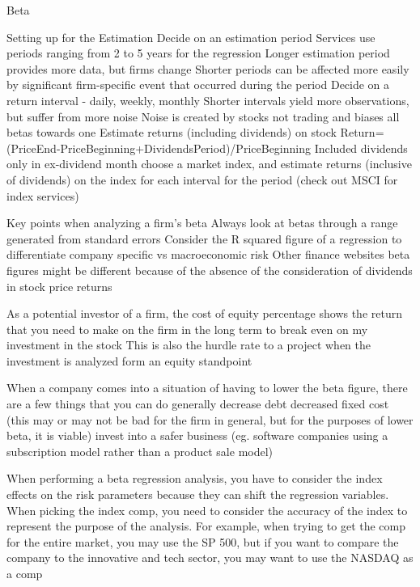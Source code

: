 \documentclass[10pt]{article}
\begin{document}
    \begin{core}{Beta}

      Setting up for the Estimation
      Decide on an estimation period
      Services use periods ranging from 2 to 5 years for the regression
      Longer estimation period provides more data, but firms change
      Shorter periods can be affected more easily by significant firm-specific event that occurred during the period
      Decide on a return interval - daily, weekly, monthly
      Shorter intervals yield more observations, but suffer from more noise
      Noise is created by stocks not trading and biases all betas towards one
      Estimate returns (including dividends) on stock
      Return=(PriceEnd-PriceBeginning+DividendsPeriod)/PriceBeginning
      Included dividends only in ex-dividend month
      choose a market index, and estimate returns (inclusive of dividends) on the index for each interval for the period (check out MSCI for index services)

      Key points when analyzing a firm’s beta
      Always look at betas through a range generated from standard errors
      Consider the R squared figure of a regression to differentiate company specific vs macroeconomic risk
      Other finance websites beta figures might be different because of the absence of the consideration of dividends in stock price returns

      As a potential investor of a firm, the cost of equity percentage shows the return that you need to make on the firm in the long term to break even on my investment in the stock
      This is also the hurdle rate to a project when the investment is analyzed form an equity standpoint

      When a company comes into a situation of having to lower the beta figure, there are a few things that you can do generally
      decrease debt
      decreased fixed cost (this may or may not be bad for the firm in general, but for the purposes of lower beta, it is viable)
      invest into a safer business (eg. software companies using a subscription model rather than a product sale model)

      When performing a beta regression analysis, you have to consider the index effects on the risk parameters because they can shift the regression variables. When picking the index comp, you need to consider the accuracy of the index to represent the purpose of the analysis. 
      For example, when trying to get the comp for the entire market, you may use the SP 500, but if you want to compare the company to the innovative and tech sector, you may want to use the NASDAQ as a comp


\end{core}
\end{document}
